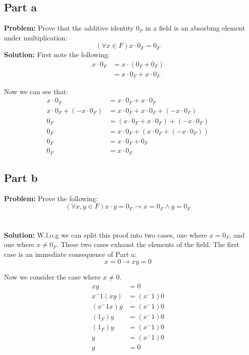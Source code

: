 \documentclass{article}
\begin{document}
\subsection*{Part a}
\textbf{Problem:} Prove that the additive identity $0_F$ in a field is an absorbing element under multiplication:
$$\left(\forall x\in F\right) x\cdot 0_F=0_F$$
\textbf{Solution:} First note the following:
\begin{align*}
  x\cdot 0_F&=x\cdot(0_F+0_F)\tag{additive identity}\\
  &=x\cdot 0_F+x\cdot 0_F\tag{distributive property}
\end{align*}

Now we can see that:
\begin{align*}
  x\cdot 0_F&=x\cdot 0_F+x\cdot 0_F\\
  x\cdot 0_F+(-x\cdot 0_F)&=x\cdot 0_F+x\cdot 0_F+(-x\cdot 0_F)\tag{additive inverse exists}\\
  0_F&=(x\cdot 0_F+x\cdot 0_F)+(-x\cdot 0_F)\tag{additive inverse}\\
  0_F&=x\cdot 0_F+(x\cdot 0_F+(-x\cdot 0_F))\tag{associativity}\\
  0_F&=x\cdot 0_F+0_F\tag{additive inverse}\\
  0_F&=x\cdot 0_F\tag{additive identity}
\end{align*}

\subsection*{Part b}
\textbf{Problem:} Prove the following:
$$\left(\forall x,y\in F\right) x\cdot y=0_F\rightarrow x=0_F\wedge y=0_F$$
\\\\
\textbf{Solution:} W.l.o.g we can split this proof into two cases, one where $x=0_F$, and one where $x\not=0_F$. These two cases exhaust the elements of the field. The first case is an immediate consequence of Part a:
$$x=0\rightarrow xy=0$$

Now we consider the case where $x\not=0$.
\begin{align*}
  xy&=0\\
  x^-1(xy)&=(x^-1)0\tag{nonzero elements have multiplicative inverse}\\
  (x^-1x)y&=(x^-1)0\tag{associativity of multiplication}\\
  (1_F)y&=(x^-1)0\tag{multiplicative inverse}\\
  (1_F)y&=(x^-1)0\tag{multiplicative identity}\\
  y&=(x^-1)0\tag{multiplicative identity}\\
  y&=0\tag{part a}\\
\end{align*}
\end{document}
